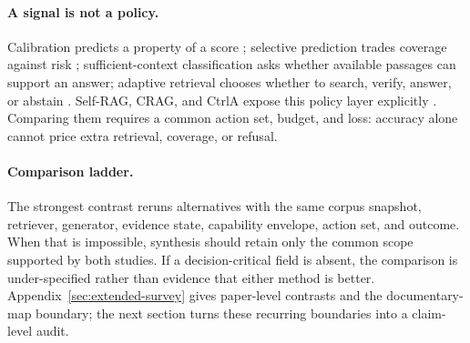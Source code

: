 \paragraph{A signal is not a policy.}
Calibration predicts a property of a score \citep{guo2017calibration};
selective prediction trades coverage against risk
\citep{geifman2017selective}; sufficient-context classification
asks whether available passages can support an answer; adaptive retrieval
chooses whether to search, verify, answer, or abstain
\citep{calibRAG2025,sufficientContext2024,whenToRetrieve2024}. Self-RAG, CRAG,
and CtrlA expose this policy layer explicitly
\citep{selfRAG2023,crag2024,ctrla2025}. Comparing them requires a common
action set, budget, and loss: accuracy alone cannot price extra retrieval,
coverage, or refusal.

\paragraph{Comparison ladder.}
The strongest contrast reruns alternatives with the same corpus snapshot,
retriever, generator, evidence state, capability envelope, action set, and
outcome. When that is impossible, synthesis should retain only the common
scope supported by both studies. If a decision-critical field is absent, the
comparison is under-specified rather than evidence that either method is
better. Appendix~\ref{sec:extended-survey} gives paper-level contrasts and the
documentary-map boundary; the next section turns these recurring boundaries
into a claim-level audit.
